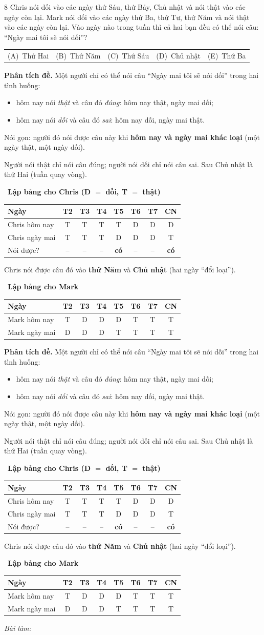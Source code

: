 \documentclass[11pt]{article}
\makeatletter
\newif\ifsol \soltrue
\newenvironment{probbox}[2]{\begin{probboxT}{#1}{#2}}{\end{probboxT}}
\newcommand{\StuProb}[2]{\begin{probboxS}{#1}{#2}\StuProbBody\end{probboxS}}
\newcommand{\probsol}[1]{%
  \begin{lrbox}{\solmeasure}\begin{minipage}{\dimexpr\linewidth-24pt\relax}#1\end{minipage}\end{lrbox}%
  \ifsol
    \begin{solbox}#1\end{solbox}%
  \else
    \setlength{\solht}{\dimexpr\ht\solmeasure+\dp\solmeasure+0.85cm\relax}%
    \ifdim\solht<1.35cm\setlength{\solht}{1.35cm}\fi
    \ifdim\solht>\StudentMaxWork\setlength{\solht}{\StudentMaxWork}\fi
    \par\noindent\begin{minipage}{\linewidth}%
    \expandafter\StuProb\StuProbArgs
    \begin{tcolorbox}[colback=white,colframe=Line,boxrule=0.8pt,arc=5pt,
      left=8pt,right=8pt,top=4pt,bottom=4pt,height=\solht]{\footnotesize\color{Slate}\itshape\WorkWord}\end{tcolorbox}%
    \end{minipage}\par\medskip
  \fi}
\newlength{\StudentMaxWork}\setlength{\StudentMaxWork}{4.5cm}
\newcommand{\step}[2]{\par\smallskip\noindent{\bfseries\color{tmBlue!85!black}\StepWord~#1.}\ {\bfseries #2}\par\nopagebreak}
\newcommand{\choices}[5]{\par\smallskip\noindent
  \begin{tabularx}{\linewidth}{@{}XXXXX@{}}(A)\ #1&(B)\ #2&(C)\ #3&(D)\ #4&(E)\ #5\end{tabularx}\par}
\def\WorkWord{Bài làm:}
\def\StepWord{Bước}
\makeatother
\begin{document}
\begin{probbox}{8}{\relax}
Chris nói dối vào các ngày thứ Sáu, thứ Bảy, Chủ nhật và nói thật vào các ngày còn lại. Mark nói dối vào các ngày thứ Ba, thứ Tư,
thứ Năm và nói thật vào các ngày còn lại. Vào ngày nào trong tuần thì cả hai bạn đều có thể nói câu: ``Ngày mai tôi sẽ nói dối''?
\choices{Thứ Hai}{Thứ Năm}{Thứ Sáu}{Chủ nhật}{Thứ Ba}
\end{probbox}
\probsol{
\textbf{Phân tích đề.} Một người chỉ có thể nói câu ``Ngày mai tôi sẽ nói dối'' trong hai tình huống:
\begin{itemize}[leftmargin=1.4em,itemsep=0pt,topsep=1pt]
\item hôm nay nói \emph{thật} và câu đó \emph{đúng}: hôm nay thật, ngày mai dối;
\item hôm nay nói \emph{dối} và câu đó \emph{sai}: hôm nay dối, ngày mai thật.
\end{itemize}
Nói gọn: người đó nói được câu này khi \textbf{hôm nay và ngày mai khác loại} (một ngày thật, một ngày dối).
\begin{recallbox}Người nói thật chỉ nói câu đúng; người nói dối chỉ nói câu sai. Sau Chủ nhật là thứ Hai (tuần quay vòng).\end{recallbox}
\step{1}{Lập bảng cho Chris (D $=$ dối, T $=$ thật)}
\begin{center}
\setlength{\tabcolsep}{4pt}
\begin{tabular}{|l|c|c|c|c|c|c|c|}
\hline
\rowcolor{tmBlue!10} Ngày & T2 & T3 & T4 & T5 & T6 & T7 & CN \\ \hline
Chris hôm nay & T & T & T & T & D & D & D \\ \hline
Chris ngày mai & T & T & T & D & D & D & T \\ \hline
Nói được? & -- & -- & -- & \textbf{có} & -- & -- & \textbf{có} \\ \hline
\end{tabular}
\end{center}
Chris nói được câu đó vào \textbf{thứ Năm} và \textbf{Chủ nhật} (hai ngày ``đổi loại'').
\step{2}{Lập bảng cho Mark}
\begin{center}
\setlength{\tabcolsep}{4pt}
\begin{tabular}{|l|c|c|c|c|c|c|c|}
\hline
\rowcolor{tmBlue!10} Ngày & T2 & T3 & T4 & T5 & T6 & T7 & CN \\ \hline
Mark hôm nay & T & D & D & D & T & T & T \\ \hline
Mark ngày mai & D & D & D & T & T & T & T \\ \hline

\end{tabular}
\end{center}}
\end{document}
